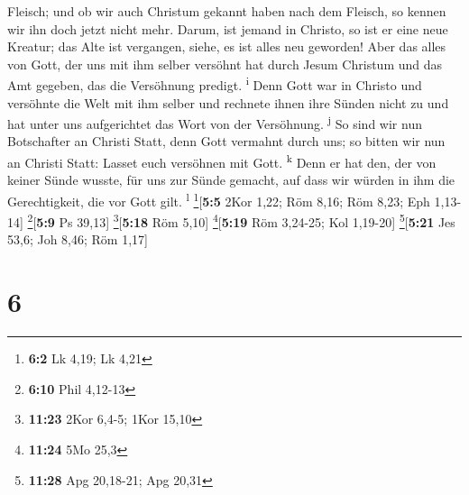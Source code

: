 Fleisch; und ob wir auch Christum gekannt haben nach dem Fleisch, so
kennen wir ihn doch jetzt nicht mehr.  Darum, ist jemand
in Christo, so ist er eine neue Kreatur; das Alte ist vergangen, siehe,
es ist alles neu geworden!  Aber das alles von Gott, der
uns mit ihm selber versöhnt hat durch Jesum Christum und das Amt
gegeben, das die Versöhnung predigt. \textsuperscript{i} 
Denn Gott war in Christo und versöhnte die Welt mit ihm selber und
rechnete ihnen ihre Sünden nicht zu und hat unter uns aufgerichtet das
Wort von der Versöhnung. \textsuperscript{j}  So sind wir
nun Botschafter an Christi Statt, denn Gott vermahnt durch uns; so
bitten wir nun an Christi Statt: Lasset euch versöhnen mit Gott.
\textsuperscript{k}  Denn er hat den, der von keiner
Sünde wusste, für uns zur Sünde gemacht, auf dass wir würden in ihm die
Gerechtigkeit, die vor Gott gilt. \textsuperscript{l}
\footnote{\textbf{6:2} Lk 4,19; Lk 4,21}{[}\textbf{5:5} 2Kor 1,22; Röm
8,16; Röm 8,23; Eph 1,13-14{]} \footnote{\textbf{6:10} Phil 4,12-13}{[}\textbf{5:9}
Ps 39,13{]} \footnote{\textbf{11:23} 2Kor 6,4-5; 1Kor 15,10}{[}\textbf{5:18}
Röm 5,10{]} \footnote{\textbf{11:24} 5Mo 25,3}{[}\textbf{5:19} Röm
3,24-25; Kol 1,19-20{]} \footnote{\textbf{11:28} Apg 20,18-21; Apg 20,31}{[}\textbf{5:21}
Jes 53,6; Joh 8,46; Röm 1,17{]}

\hypertarget{section-5}{%
\section{6}\label{section-5}}

